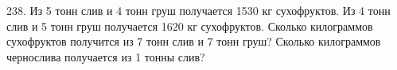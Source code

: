 238. Из 5 тонн слив и 4 тонн груш получается 1530 кг сухофруктов. Из 4 тонн слив и 5 тонн груш получается 1620 кг сухофруктов. Сколько килограммов сухофруктов получится из 7 тонн слив и 7 тонн груш? Сколько килограммов чернослива получается из 1 тонны слив?\\
